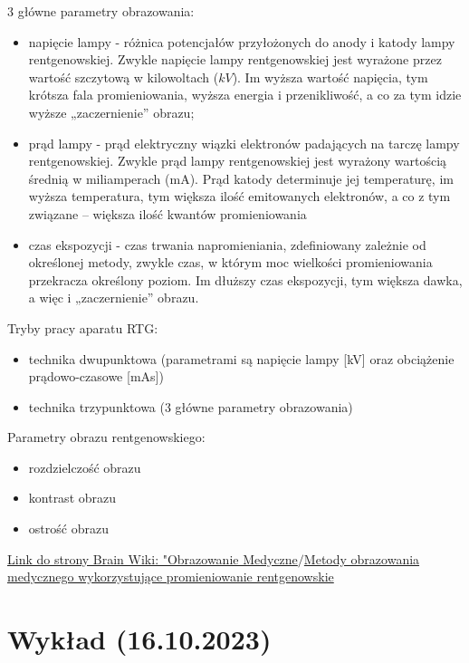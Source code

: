 \documentclass{article}
\begin{document}
3 główne parametry obrazowania:
\begin{itemize}
    \item napięcie lampy - różnica potencjałów przyłożonych do anody i katody lampy rentgenowskiej. Zwykle napięcie lampy rentgenowskiej jest wyrażone przez wartość szczytową w kilowoltach ($kV$). Im wyższa wartość napięcia, tym krótsza fala promieniowania, wyższa energia i przenikliwość, a co za tym idzie wyższe „zaczernienie” obrazu;
    \item prąd lampy - prąd elektryczny wiązki elektronów padających na tarczę lampy rentgenowskiej. Zwykle prąd lampy rentgenowskiej jest wyrażony wartością średnią w miliamperach (mA). Prąd katody determinuje jej temperaturę, im wyższa temperatura, tym większa ilość emitowanych elektronów, a co z tym związane – większa ilość kwantów promieniowania
    \item czas ekspozycji - czas trwania napromieniania, zdefiniowany zależnie od określonej metody, zwykle czas, w którym moc wielkości promieniowania przekracza określony poziom. Im dłuższy czas ekspozycji, tym większa dawka, a więc i „zaczernienie” obrazu.
\end{itemize}

Tryby pracy aparatu RTG:
\begin{itemize}
    \item technika dwupunktowa (parametrami są napięcie lampy [kV] oraz obciążenie prądowo-czasowe [mAs])
    \item technika trzypunktowa (3 główne parametry obrazowania)
\end{itemize}

Parametry obrazu rentgenowskiego:
\begin{itemize}
    \item rozdzielczość obrazu
    \item kontrast obrazu
    \item ostrość obrazu
\end{itemize}

\href{https://brain.fuw.edu.pl/edu/index.php/Obrazowanie:Obrazowanie_Medyczne/Metody_obrazowania_medycznego_wykorzystuj%C4%85ce_promieniowanie_rentgenowskie}{Link do strony Brain Wiki: "Obrazowanie Medyczne$/$Metody obrazowania medycznego wykorzystujące promieniowanie rentgenowskie}

\section{Wykład (16.10.2023)}
\end{document}
